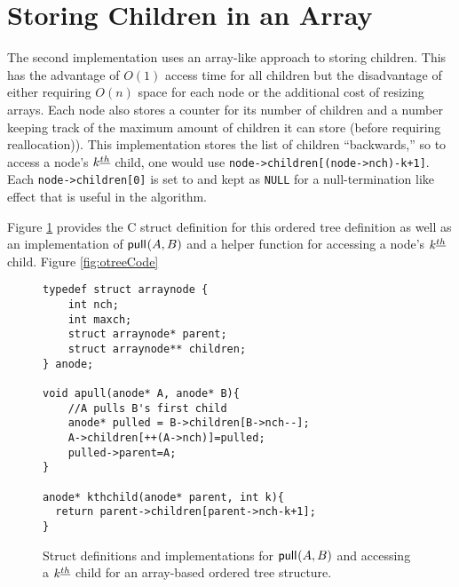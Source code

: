 \section{Storing Children in an Array}\label{sec:otree-arr}
The second implementation uses an array-like approach to storing children.  This has the advantage of $O(1)$ access time for all children but the disadvantage of either requiring $O(n)$ space for each node or the additional cost of resizing arrays.  Each node also stores a counter for its number of children and a number keeping track of the maximum amount of children it can store (before requiring reallocation)).  This implementation stores the list of children ``backwards,'' so to access a node's $k^{\underline{th}}$ child, one would use \verb_node->children[(node->nch)-k+1]_.  Each \verb+node->children[0]+ is set to and kept as \verb+NULL+ for a null-termination like effect that is useful in the algorithm.  

Figure \ref{fig:otreestarter-arr} provides the C struct definition for this ordered tree definition as well as an implementation of $\mathsf{pull}_{}(A,B)$ and a helper function for accessing a node's $k^{\underline{th}}$ child. Figure \ref{fig:otreeCode}
    \begin{figure}
	\begin{center}

	    \begin{Verbatim}
typedef struct arraynode {
    int nch; 
    int maxch;
    struct arraynode* parent;
    struct arraynode** children;
} anode;

void apull(anode* A, anode* B){ 
    //A pulls B's first child
    anode* pulled = B->children[B->nch--];
    A->children[++(A->nch)]=pulled;
    pulled->parent=A;
}

anode* kthchild(anode* parent, int k){
  return parent->children[parent->nch-k+1];
}
	    \end{Verbatim}
	\end{center}

    \cprotect\caption{Struct definitions and implementations for $\mathsf{pull}_{}(A,B)$ and accessing a $k^{\underline{th}}$ child for an array-based ordered tree structure.}
    \label{fig:otreestarter-arr}
\end{figure}

